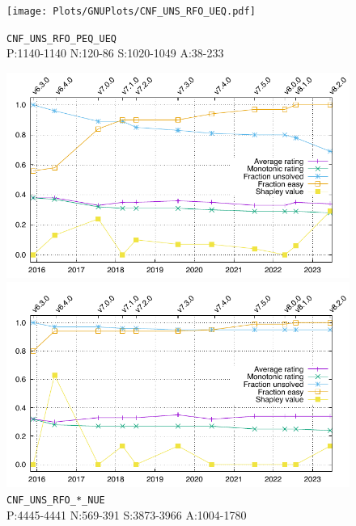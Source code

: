 \documentclass[runningheads]{llncs}
\begin{document}
\begin{figure}[b!]
\centering
\begin{minipage}[t]{.49\textwidth}
  \centering
  \texttt{[image: Plots/GNUPlots/CNF\_UNS\_RFO\_UEQ.pdf]}
  \vspace*{-2em}
  \caption{{\tt CNF\_UNS\_RFO\_PEQ\_UEQ} \\ 
           {\scriptsize P:1140-1140 N:120-86 S:1020-1049 A:38-233}}
  \label{Plot_CNF_UEQ}
\end{minipage}
\begin{minipage}[t]{.49\textwidth}
  \centering
  \includegraphics[width=\textwidth]{Plots/GNUPlots/CNF_UNS_RFO_NUE.pdf}
  \vspace*{-2em}
  \caption{{\tt CNF\_UNS\_RFO\_*\_NUE} \\
           {\scriptsize P:4445-4441 N:569-391 S:3873-3966 A:1004-1780}}
  \label{Plot_CNF_UNS}
\end{minipage}
\begin{minipage}[t]{.49\textwidth}
  \centering
  \includegraphics[width=\textwidth]{Plots/GNUPlots/CNF_SAT_RFO.pdf}

\end{minipage}
\end{figure}
\end{document}
